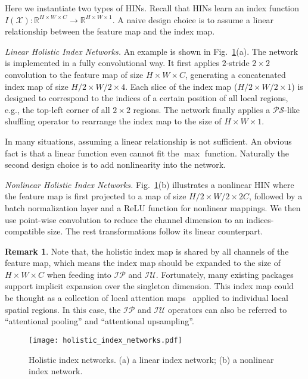 \documentclass[10pt,twocolumn,letterpaper]{article}
\begin{document}
Here we instantiate two types of HINs. Recall that HINs learn an index function $I(\mathcal{X}):\mathbb{R}^{H\times W\times C}\rightarrow\mathbb{R}^{H\times W\times1}$. A naive design choice is to assume a linear relationship between the feature map and the index map.

\vspace{5pt}
\noindent\textit{Linear Holistic Index Networks.} An example is shown in Fig.~\ref{fig:holistic_networks}(a). The network is implemented in a fully convolutional way. It first applies $2$-stride $2\times2$ convolution to the feature map of size $H\times W\times C$, generating a concatenated index map of size $H/2\times W/2\times 4$. Each slice of the index map ($H/2\times W/2\times 1$) is designed to correspond to the indices of a certain position of all local regions, e.g., the top-left corner of all $2\times 2$ regions. The network finally applies a $\mathcal{PS}$-like shuffling operator to rearrange the index map to the size of $H\times W\times 1$.

In many situations, assuming a linear relationship is not sufficient. An obvious fact is that a linear function even cannot fit the $\max$ function. Naturally the second design choice is to add nonlinearity into the network.

\vspace{5pt}
\noindent\textit{Nonlinear Holistic Index Networks.} Fig.~\ref{fig:holistic_networks}(b) illustrates a nonlinear HIN where the feature map is first projected to a map of size $H/2\times W/2\times 2C$, followed by a batch normalization layer and a ReLU function for nonlinear mappings. We then use point-wise convolution to reduce the channel dimension to an indices-compatible size. The rest transformations follow its linear counterpart.

\vspace{5pt}
\noindent\textbf{Remark 1}. Note that, the holistic index map is shared by all channels of the feature map, which means the index map should be expanded to the size of $H\times W\times C$ when feeding into $\mathcal{IP}$ and $\mathcal{IU}$. Fortunately, many existing packages support implicit expansion over the singleton dimension. This index map could be thought as a collection of local attention maps~\cite{mnih2014recurrent} applied to individual local spatial regions. In this case, the $\mathcal{IP}$ and $\mathcal{IU}$ operators can also be referred to ``attentional pooling'' and ``attentional upsampling''.

\begin{figure}[!tb]
	\captionsetup{font=small,singlelinecheck=true}
	\setlength{\abovecaptionskip}{10pt}
	\centering
	\texttt{[image: holistic\_index\_networks.pdf]}\vspace{-10pt}
	\caption{Holistic index networks. (a) a linear index network; (b) a nonlinear index network.}
	\label{fig:holistic_networks}
\end{figure}
\end{document}
